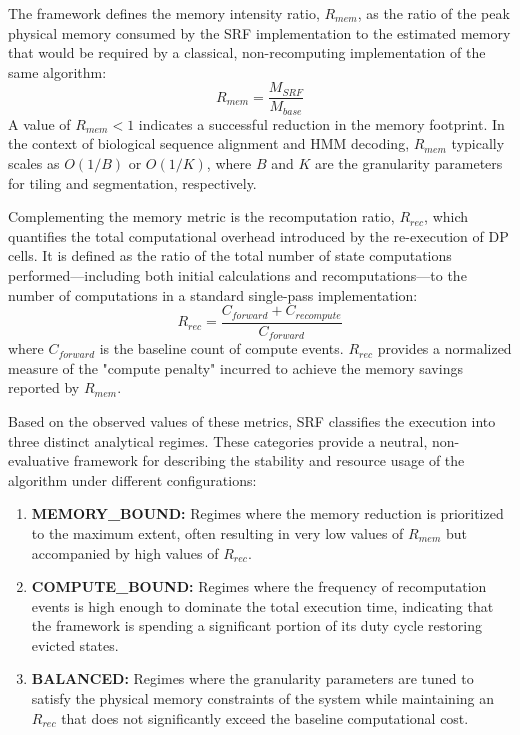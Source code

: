 The framework defines the memory intensity ratio, $R_{mem}$, as the ratio of the peak physical memory consumed by the SRF implementation to the estimated memory that would be required by a classical, non-recomputing implementation of the same algorithm:
\begin{equation}
R_{mem} = \frac{M_{SRF}}{M_{base}}
\end{equation}
A value of $R_{mem} < 1$ indicates a successful reduction in the memory footprint. In the context of biological sequence alignment and HMM decoding, $R_{mem}$ typically scales as $O(1/B)$ or $O(1/K)$, where $B$ and $K$ are the granularity parameters for tiling and segmentation, respectively.

Complementing the memory metric is the recomputation ratio, $R_{rec}$, which quantifies the total computational overhead introduced by the re-execution of DP cells. It is defined as the ratio of the total number of state computations performed---including both initial calculations and recomputations---to the number of computations in a standard single-pass implementation:
\begin{equation}
R_{rec} = \frac{C_{forward} + C_{recompute}}{C_{forward}}
\end{equation}
where $C_{forward}$ is the baseline count of compute events. $R_{rec}$ provides a normalized measure of the "compute penalty" incurred to achieve the memory savings reported by $R_{mem}$.

Based on the observed values of these metrics, SRF classifies the execution into three distinct analytical regimes. These categories provide a neutral, non-evaluative framework for describing the stability and resource usage of the algorithm under different configurations:
\begin{enumerate}
    \item \textbf{MEMORY\_BOUND:} Regimes where the memory reduction is prioritized to the maximum extent, often resulting in very low values of $R_{mem}$ but accompanied by high values of $R_{rec}$.
    \item \textbf{COMPUTE\_BOUND:} Regimes where the frequency of recomputation events is high enough to dominate the total execution time, indicating that the framework is spending a significant portion of its duty cycle restoring evicted states.
    \item \textbf{BALANCED:} Regimes where the granularity parameters are tuned to satisfy the physical memory constraints of the system while maintaining an $R_{rec}$ that does not significantly exceed the baseline computational cost.
\end{enumerate}

